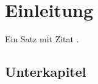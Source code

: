 \chapter{Einleitung}
Ein Satz mit Zitat \cite{Jarre.2004}.

\lipsum[1-5]

\section{Unterkapitel}
\lipsum[6-12]
